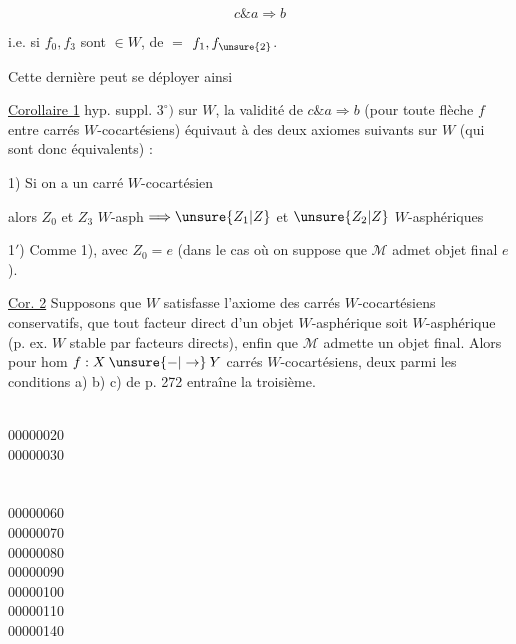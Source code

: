 \[
c\mathbin{\&}a\Longrightarrow b
\]

i.e. si $f_0,f_3$ sont $\in W$, de $=$ $f_1,f_{\unsure{2}}$.

Cette dernière  peut se déployer ainsi

\uline{Corollaire 1}  hyp. suppl. $3^\circ)$ sur $W$, la validité de $c\mathbin{\&}a\Longrightarrow b$ (pour toute flèche $f$ entre carrés $W$-cocartésiens) équivaut à  des deux  axiomes suivants sur $W$ (qui sont donc équivalents) :

1) Si on a un carré  $W$-cocartésien


alors $Z_0$ et $Z_3$ $W$-asph $\Longrightarrow\unsure{Z_1|Z}$ et $\unsure{Z_2|Z}$ $W$-asphériques

1$'$) Comme 1), avec $Z_0=e$ (dans le cas où on suppose que $\mathcal M$ admet objet final $e$).

\uline{Cor. 2} Supposons que $W$ satisfasse l'axiome des carrés $W$-cocartésiens conservatifs, que tout facteur direct d'un objet $W$-asphérique soit $W$-asphérique (p. ex. $W$ stable par facteurs directs), enfin que $\mathcal M$ admette un objet final. Alors pour   hom $f:X\mathbin{\unsure{-|\to}}Y$  carrés $W$-cocartésiens,  deux parmi les conditions a) b) c) de p. 272 entraîne la troisième.



\begin{flushleft}\ttfamily
{} \\
00000020\\
00000030\\
\\
\\
00000060\\
00000070\\
00000080\\
00000090\\
00000100\\
00000110\\
00000140
\end{flushleft}
